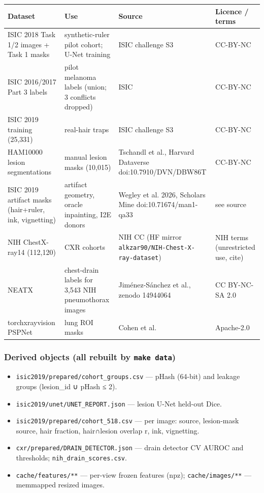 {\small
{ %
\begin{longtable}[]{@{}llll@{}}
\toprule\noalign{}
Dataset & Use & Source & Licence / terms \\
\midrule\noalign{}
\endhead
\bottomrule\noalign{}
\endlastfoot
ISIC 2018 Task 1/2 images + Task 1 masks & synthetic-ruler pilot cohort; U-Net training & ISIC challenge S3 & CC-BY-NC \\
ISIC 2016/2017 Part 3 labels & pilot melanoma labels (union; 3 conflicts dropped) & ISIC & CC-BY-NC \\
ISIC 2019 training (25,331) & real-hair traps & ISIC challenge S3 & CC-BY-NC \\
HAM10000 lesion segmentations & manual lesion masks (10,015) & Tschandl et al., Harvard Dataverse doi:10.7910/DVN/DBW86T & CC-BY-NC \\
ISIC 2019 artifact masks (hair+ruler, ink, vignetting) & artifact geometry, oracle inpainting, I2E donors & Wegley et al. 2026, Scholars\textquotesingle{} Mine doi:10.71674/man1-qa33 & see source \\
NIH ChestX-ray14 (112,120) & CXR cohorts & NIH CC (HF mirror \texttt{alkzar90/NIH-Chest-X-ray-dataset}) & NIH terms (unrestricted use, cite) \\
NEATX & chest-drain labels for 3,543 NIH pneumothorax images & Jiménez-Sánchez et al., zenodo 14944064 & CC BY-NC-SA 2.0 \\
torchxrayvision PSPNet & lung ROI masks & Cohen et al. & Apache-2.0 \\
\end{longtable}
}

\subsubsection{\texorpdfstring{Derived objects (all rebuilt by \texttt{make\ data})}{Derived objects (all rebuilt by make data)}}\label{derived-objects-all-rebuilt-by-make-data}

\begin{itemize}

\item
  \texttt{isic2019/prepared/cohort\_groups.csv} --- pHash (64-bit) and leakage groups (lesion\_id ∪ pHash ≤ 2).
\item
  \texttt{isic2019/unet/UNET\_REPORT.json} --- lesion U-Net held-out Dice.
\item
  \texttt{isic2019/prepared/cohort\_518.csv} --- per image: source, lesion-mask source, hair fraction, hair∩lesion overlap r, ink, vignetting.
\item
  \texttt{cxr/prepared/DRAIN\_DETECTOR.json} --- drain detector CV AUROC and thresholds; \texttt{nih\_drain\_scores.csv}.
\item
  \texttt{cache/features/**} --- per-view frozen features (npz); \texttt{cache/images/**} --- memmapped resized images.
\end{itemize}

}

